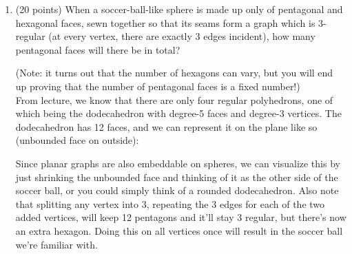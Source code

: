 \documentclass[11pt]{article}
\newcommand{\n}{\vspace{0.2cm}}
\begin{document}
\begin{enumerate}
\begin{proof}
        Each vertex \(v \in V'\) has at most \(\Delta\) neighbors, so if we gather each \(v \in V'\) along with all of \(v\)'s neighbors, we get no more than \(\sum_{v \in V'} (1+d(v))\) vertices (probably less unless all \(v \in V'\) have no adjacent vertices in common). This gives us
        \[\#\{\text{vertices reachable from } V'\} \leq \sum_{v \in V'} (1+d(v)) \leq \sum_{v \in V'} (1+\Delta) = \alpha(1+\Delta) < \nu,\]
        But this means that there exists a vertex \(u \in V \setminus V'\) that isn't adjacent to any \(v \in V'\), meaning that \(V'\) cannot be a maximum stable set, which is a contradiction.
      \end{proof}
      

    \item (20 points) When a soccer-ball-like sphere is made up only of pentagonal and hexagonal faces, sewn together so that its seams form a graph which is 3-regular (at every vertex, there are exactly 3 edges incident), how many pentagonal faces will there be in total?

(Note: it turns out that the number of hexagons can vary, but you will end up proving that the number of pentagonal faces is a fixed number!) \n\\
From lecture, we know that there are only four regular polyhedrons, one of which being the dodecahedron with degree-5 faces and degree-3 vertices.  The dodecahedron has 12 faces, and we can represent it on the plane like so (unbounded face on outside):
      \begin{center}
        \resizebox{!}{8cm} {
                }
      \end{center}
      Since planar graphs are also embeddable on spheres, we can visualize this by just shrinking the unbounded face and thinking of it as the other side of the soccer ball, or you could simply think of a rounded dodecahedron.  Also note that splitting any vertex into 3, repeating the 3 edges for each of the two added vertices, will keep 12 pentagons and it'll stay 3 regular, but there's now an extra hexagon.  Doing this on all vertices once will result in the soccer ball we're familiar with. \n


\end{enumerate}
\end{document}
